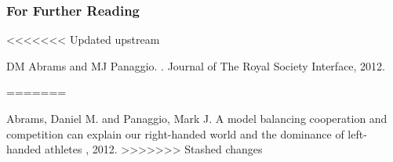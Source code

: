 \documentclass{beamer}
\begin{document}
\begin{frame}[allowframebreaks]
  \frametitle<presentation>{For Further Reading}
    
  \begin{thebibliography}{10}
    
<<<<<<< Updated upstream
  \beamertemplatebookbibitems

    DM Abrams and MJ Panaggio.
    .
    \newblock Journal of The Royal Society Interface, 2012.
 
    
  \beamertemplatearticlebibitems

=======
  \beamertemplatearticlebibitems

    Abrams, Daniel M. and Panaggio, Mark J.
    \newblock A model balancing cooperation and competition can explain our right-handed world and the dominance of left-handed athletes
    ,
    2012.
>>>>>>> Stashed changes
  \end{thebibliography}
\end{frame}
\end{document}
